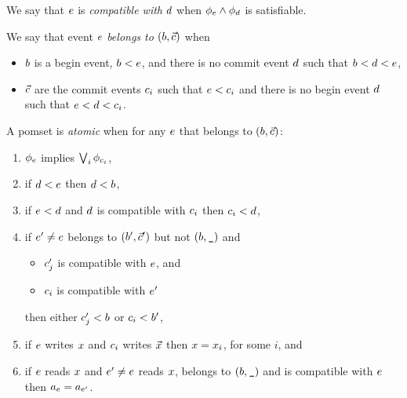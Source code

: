 We say that $e$ is \emph{compatible with} $d$ when
$\phi_e\land\phi_d$ is satisfiable.

We say that  event $e$ \emph{belongs to} $(b,\vec{c})$ when
\begin{itemize}
\item $b$ is a begin event, $b<e$, and
  there is no commit event $d$ such that $b<d<e$,
\item $\vec{c}$ are the commit events $c_i$ such that $e<c_i$ and
  there is no begin event $d$ such that $e<d<c_i$.
\end{itemize}

\begin{definition}
  A pomset is \emph{atomic} when for any $e$ that belongs to $(b,\vec{c})$:
  \begin{enumerate}
  \item\label{xcommitform} $\phi_{e}$ implies $\textstyle\bigvee_i\phi_{c_i}$,
  \item\label{xliftb} if $d<e$ then $d<b$, 
  \item\label{xliftc} if $e<d$ and $d$ is compatible with
    $c_i$ then $c_i<d$, 
  \item\label{xtotal} if $e'\neq e$ belongs to $(b',\vec{c}')$ but not
    $(b,\texttt{\_})$ and
    \begin{itemize}
    \item $c'_j$ is compatible with $e$, and 
    \item $c_i$ is compatible with $e'$ 
    \end{itemize}
    then either
    $c'_j<b$ or
    $c_i<b'$,
  \item\label{xcommitvars} if $e$ writes $x$ and $c_i$ writes
    $\vec{x}$ then $x=x_i$, for some $i$, and
  \item\label{xreadunique} if $e$ reads $x$ and $e'\neq e$ reads
    $x$, belongs to $(b,\texttt{\_})$ and is compatible with $e$
    then $a_{e}=a_{e'}$.
  \end{enumerate}
\end{definition}
